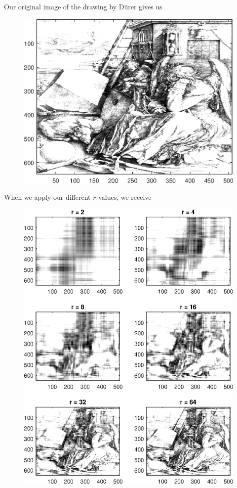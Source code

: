 \documentclass[12pt]{article}
\begin{document}
\begin{enumerate}[leftmargin=0.6cm,label=(\alph*)]
\begin{figure}[H]
\begin{center}
		\end{center}
	\end{figure}
	Our original image of the drawing by D\"urer gives us
	\begin{figure}[H]
		\begin{center}
			\includegraphics[scale=.6]{hw3p10p3.eps}
		\end{center}
	\end{figure}
	When we apply our different $ r $ values, we receive
	\begin{figure}[H]
		\begin{center}
			\includegraphics[scale=.8]{hw3p10p4.eps}

\end{center}
\end{figure}
\end{enumerate}
\end{document}
